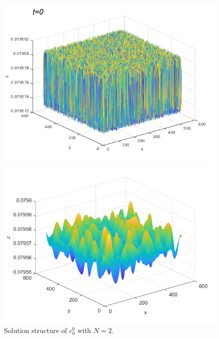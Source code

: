 \begin{frame}
\begin{figure}[H]
\begin{minipage}{0.4\textwidth}
		\includegraphics[scale=0.25]{Bilder_wxwy/4th_t=0_mx=my=512_random}
	\end{minipage}
	\hfill 
	\begin{minipage}{0.4\textwidth}
	    \includegraphics[scale=0.25]{Bilder_wxwy/4th_t=100_mx=my=512_random}
    \end{minipage}
 \caption{Solution structure of $c^0_0$ with $N = 2$.}
    \end{figure}
\end{frame}


